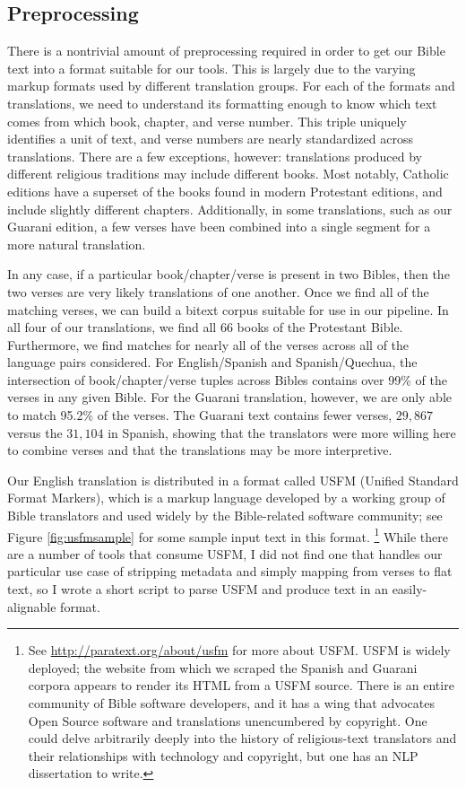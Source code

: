 \subsection{Preprocessing}
There is a nontrivial amount of preprocessing required in order to get our
Bible text into a format suitable for our tools.  This is largely due to the
varying markup formats used by different translation groups.
For each of the formats and translations, we need to understand its formatting
enough to know which text comes from which book, chapter, and verse number.
This triple uniquely identifies a unit of text, and verse numbers are nearly
standardized across translations.  There are a few exceptions, however:
translations produced by different religious traditions may include different
books. Most notably, Catholic editions have a superset of the books found in
modern Protestant editions, and include slightly different chapters.
Additionally, in some translations, such as our Guarani edition, a few verses
have been combined into a single segment for a more natural translation.

In any case, if a particular book/chapter/verse is present in two Bibles, then
the two verses are very likely translations of one another. Once we find all of
the matching verses, we can build a bitext corpus suitable for use in our
pipeline.  In all four of our translations, we find all 66 books of the
Protestant Bible. Furthermore, we find matches for nearly all of the verses
across all of the language pairs considered. For English/Spanish and
Spanish/Quechua, the intersection of book/chapter/verse tuples across Bibles
contains over 99\% of the verses in any given Bible. For the Guarani
translation, however, we are only able to match 95.2\% of the verses. The
Guarani text contains fewer verses, $29,867$ versus the $31,104$ in Spanish,
showing that the translators were more willing here to combine verses and that
the translations may be more interpretive.

Our English translation is distributed in a format called USFM (Unified
Standard Format Markers), which is a markup language developed by a working
group of Bible translators and used widely by the Bible-related software
community; see Figure \ref{fig:usfmsample} for some sample input text in this
format.
\footnote{See \url{http://paratext.org/about/usfm} for more about USFM. USFM is
widely deployed; the website from which we scraped the Spanish and Guarani
corpora appears to render its HTML from a USFM source.  There is an entire
community of Bible software developers, and it has a wing that advocates Open
Source software and translations unencumbered by copyright.  One could delve
arbitrarily deeply into the history of religious-text translators and their
relationships with technology and copyright, but one has an NLP dissertation to
write.}
While there are a number of tools that consume USFM, I did not find one that
handles our particular use case of stripping metadata and simply mapping from
verses to flat text, so I wrote a short script to parse USFM and produce text
in an easily-alignable format.

